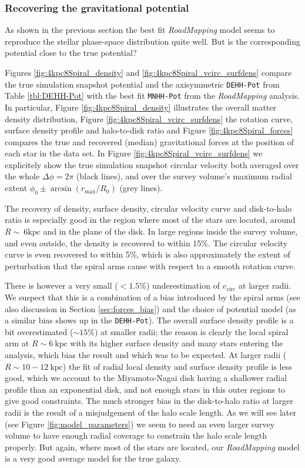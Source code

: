 \documentclass[iop,revtex4,numberedappendix,appendixfloats]{emulateapj}
\newcommand{\RM}{{\sl RoadMapping}}
\begin{document}
\subsubsection{Recovering the gravitational potential} \label{sec:4kpc8Spiral_potential}

As shown in the previous section the best fit \RM{} model seems to reproduce the stellar phase-space distribution quite well. But is the corresponding potential close to the true potential? 

Figures \ref{fig:4kpc8Spiral_density} and \ref{fig:4kpc8Spiral_vcirc_surfdens} compare the true simulation snapshot potential and the axisymmetric \texttt{DEHH-Pot} from Table \ref{tbl:DEHH-Pot} with the best fit \texttt{MNHH-Pot} from the \RM{} analysis. In particular, Figure \ref{fig:4kpc8Spiral_density} illustrates the overall matter density distribution, Figure \ref{fig:4kpc8Spiral_vcirc_surfdens} the rotation curve, surface density profile and halo-to-disk ratio and Figure \ref{fig:4kpc8Spiral_forces} compares the true and recovered (median) gravitational forces at the position of each star in the data set. In Figure \ref{fig:4kpc8Spiral_vcirc_surfdens} we explicitely show the true simulation snapshot circular velocity both averaged over the whole $\Delta\phi=2\pi$ (black lines), and over the survey volume's maximum radial extent $\phi_0\pm \arcsin(r_\text{max}/R_0)$ (grey lines).

The recovery of density, surface density, circular velocity curve and disk-to-halo ratio is especially good in the region where most of the stars are located, around $R\sim~6\text{kpc}$ and in the plane of the disk. In large regions inside the survey volume, and even outside, the density is recovered to within 15\%. The circular velocity curve is even recovered to within 5\%, which is also approximately the extent of perturbation that the spiral arms cause with respect to a smooth rotation curve.

There is however a very small ($<1.5\%$) underestimation of $v_\text{circ}$ at larger radii. We suspect that this is a combination of a bias introduced by the spiral arms (see also discussion in Section \ref{sec:forces_bias}) and the choice of potential model (as a similar bias shows up in the \texttt{DEHH-Pot}). The overall surface density profile is a bit overestimated ($\sim 15\%$) at smaller radii; the reason is clearly the local spiral arm at $R\sim6~\text{kpc}$ with its higher surface density  and many stars entering the analysis, which bias the result and which was to be expected. At larger radii ($R\sim10-12~\text{kpc}$) the fit of radial local density and surface density profile is less good, which we account to the Miyamoto-Nagai disk having a shallower radial profile than an exponential disk, and not enough stars in this outer regions to give good constraints. The much stronger bias in the disk-to-halo ratio at larger radii is the result of a misjudgement of the halo scale length. As we will see later (see Figure \ref{fig:model_parameters}) we seem to need an even larger survey volume to have enough radial coverage to constrain the halo scale length properly. But again, where most of the stars are located, our \RM{} model is a very good average model for the true galaxy.
\end{document}
